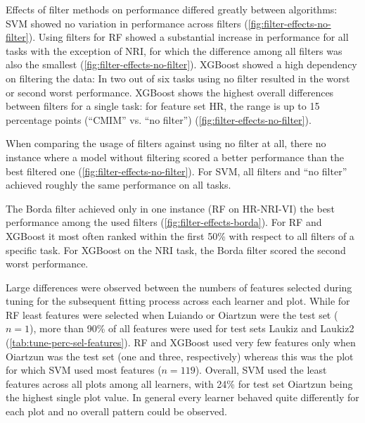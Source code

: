 \documentclass[peerreview]{IEEEtran}
\begin{document}
Effects of filter methods on performance differed greatly between algorithms:
SVM showed no variation in performance across filters (\autoref{fig:filter-effects-no-filter}).
Using filters for RF showed a substantial increase in performance for all tasks with the exception of NRI, for which the difference among all filters was also the smallest (\autoref{fig:filter-effects-no-filter}).
XGBoost showed a high dependency on filtering the data: In two out of six tasks using no filter resulted in the worst or second worst performance.
XGBoost shows the highest overall differences between filters for a single task: for feature set HR, the range is up to 15 percentage points (\enquote{CMIM} vs. \enquote{no filter}) (\autoref{fig:filter-effects-no-filter}).

When comparing the usage of filters against using no filter at all, there no instance where a model without filtering scored a better performance than the best filtered one (\autoref{fig:filter-effects-no-filter}).
For SVM, all filters and \enquote{no filter} achieved roughly the same performance on all tasks.

The Borda filter achieved only in one instance (RF on HR-NRI-VI) the best performance among the used filters (\autoref{fig:filter-effects-borda}).
For RF and XGBoost it most often ranked within the first 50\% with respect to all filters of a specific task.
For XGBoost on the NRI task, the Borda filter scored the second worst performance.

Large differences were observed between the numbers of features selected during tuning for the subsequent fitting process across each learner and plot.
While for RF least features were selected when Luiando or Oiartzun were the test set ($n = 1$), more than 90\% of all features were used for test sets Laukiz and Laukiz2 (\autoref{tab:tune-perc-sel-features}).
RF and XGBoost used very few features only when Oiartzun was the test set (one and three, respectively) whereas this was the plot for which SVM used most features ($n = 119$).
Overall, SVM used the least features across all plots among all learners, with 24\% for test set Oiartzun being the highest single plot value.
In general every learner behaved quite differently for each plot and no overall pattern could be observed.
\end{document}
